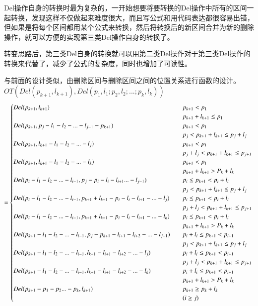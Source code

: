 \par Del操作自身的转换时最为复杂的，一开始想要将要转换的Del操作中所有的区间一起转换，发现这样不仅做起来难度很大，而且写公式和用代码表达都很容易出错，但如果是将每个区间都用某个公式来转换，然后将转换后的新区间合并为新的删除操作，就可以方便的实现第三类Del操作自身的转换了。
\par 转变思路后，第三类Del自身的转换就可以用第二类Del操作对于第三类Del操作的转换来代替了，减少了公式的复杂度，同时也增加了可读性。
\par 与前面的设计类似，由删除区间与删除区间之间的位置关系进行函数的设计。\\
\newpage
$OT(Del(p_{k+1},l_{k+1}),Del(p_1,l_1;p_2,l_2;...;p_k,l_k))$\\
\begin{equation}
= \begin{cases}
Del(p_{k+1},l_{k+1}) \quad &p_{k+1} < p_1 \quad \\ &p_{k+1}+l_{k+1} \le p_1 \\
Del(p_{k+1},p_j-l_1-l_2-...-l_{j-1}-p_{k+1}) \quad &p_{k+1} < p_1 \quad \\ &p_j < p_{k+1}+l_{k+1} \le p_j+l_j \\
Del(p_{k+1},l_{k+1}-l_1-l_2-...-l_j) \quad &p_{k+1} < p_1 \quad \\& p_j+l_j < p_{k+1}+l_{k+1} \le p_{j+1} \\
Del(p_{k+1},l_{k+1}-l_1-l_2-...-l_k) \quad &p_{k+1} < p_1 \quad \\& p_{k+1}+l_{k+1} > P_k+l_k  \\

Del(p_i-l_1-l_2-...-l_{i-1},p_j-p_i-l_i-l_{i+1}...-l_{j-1})        \quad &p_i \le p_{k+1} < p_i+l_i \quad \\ &p_j < p_{k+1}+l_{k+1} \le p_j+l_j \\
Del(p_i-l_1-l_2-...-l_{i-1},p_{k+1}+l_{k+1}-p_i-l_i-l_{i+1}-...-l_j) \quad &p_i \le p_{k+1} < p_i+l_i \quad \\& p_j+l_j < p_{k+1}+l_{k+1} \le p_{j+1} \\
Del(p_i-l_1-l_2-...-l_{i-1},p_{k+1}+l_{k+1}-p_i-l_i-l_{i+1}-...-l_k) \quad &p_i \le p_{k+1} < p_i+l_i \quad \\& p_{k+1}+l_{k+1} > P_k+l_k  \\


Del(p_{k+1}-l_1-l_2-...-l_{i-1},p_j-p_{k+1}-l_{i+1}-l_{i+2}-...-l_{j-1})    \quad &p_i+l_i \le p_{k+1} < p_{i+1} \quad \\& p_j < p_{k+1}+l_{k+1} \le p_j+l_j \\
Del(p_{k+1}-l_1-l_2-...-l_{i-1},l_{k+1}-l_{i+1}-l_{i+2}-...-l_j)    \quad &p_i+l_i \le p_{k+1} < p_{i+1} \quad \\& p_j+l_j < p_{k+1}+l_{k+1} \le p_{j+1} \\
Del(p_{k+1}-l_1-l_2-...-l_{i-1},l_{k+1}-l_{i+1}-l_{i+2}-...-l_k)    \quad &p_i+l_i \le p_{k+1} < p_{i+1} \quad \\& p_{k+1}+l_{k+1} > P_k+l_k  \\
Del(p_{k+1}-p_1-p_2...-p_k,l_{k+1}) \quad &p_{k+1} \ge p_k+l_k
\\&(i \ge j)
 \end{cases}\\
\end{equation}

